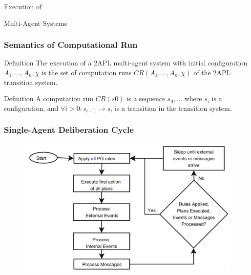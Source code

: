 	\begin{frame}
		\Huge{\centerline{Execution of}}
		\Huge{\centerline{Multi-Agent Systems}}
	\end{frame}
	
	
	\begin{frame}
		\frametitle{Semantics of Computational Run }
		\begin{block}{Definition}
			The execution of a 2APL multi-agent system with initial configuration $A_1,...,A_n, \chi$ is the set of computation runs $CR(A_1,...,A_n, \chi)$ of the 2APL transition system.
		\end{block}
		\begin{block}{Definition}
			A computation run $CR(s0)$ is a sequence $s_0,...$ where $s_i$ is a
			configuration, and $ \forall{i>0} : s_{i−1} \rightarrow s_i$ is a transition in the transition system.
		\end{block}
		
	\end{frame}
	
	
	
	\begin{frame}
		\frametitle{Single-Agent Deliberation Cycle}
		\begin{figure}
			\includegraphics[width=1\textwidth]{deliberation-cycle-individual-2apl}
		\end{figure}
	\end{frame}
	
	

